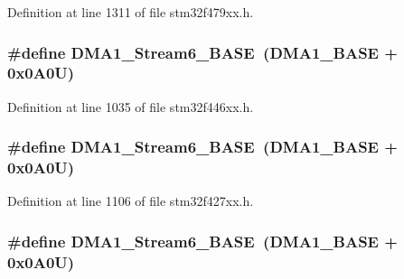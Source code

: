 Definition at line 1311 of file stm32f479xx.\+h.

\subsubsection[{\texorpdfstring{D\+M\+A1\+\_\+\+Stream6\+\_\+\+B\+A\+SE}{DMA1_Stream6_BASE}}]{\setlength{\rightskip}{0pt plus 5cm}\#define D\+M\+A1\+\_\+\+Stream6\+\_\+\+B\+A\+SE~({\bf D\+M\+A1\+\_\+\+B\+A\+SE} + 0x0\+A0\+U)}\hypertarget{group___peripheral__memory__map_ga58998ddc40adb6361704d6c9dad08125}{}\label{group___peripheral__memory__map_ga58998ddc40adb6361704d6c9dad08125}


Definition at line 1035 of file stm32f446xx.\+h.

\subsubsection[{\texorpdfstring{D\+M\+A1\+\_\+\+Stream6\+\_\+\+B\+A\+SE}{DMA1_Stream6_BASE}}]{\setlength{\rightskip}{0pt plus 5cm}\#define D\+M\+A1\+\_\+\+Stream6\+\_\+\+B\+A\+SE~({\bf D\+M\+A1\+\_\+\+B\+A\+SE} + 0x0\+A0\+U)}\hypertarget{group___peripheral__memory__map_ga58998ddc40adb6361704d6c9dad08125}{}\label{group___peripheral__memory__map_ga58998ddc40adb6361704d6c9dad08125}


Definition at line 1106 of file stm32f427xx.\+h.

\subsubsection[{\texorpdfstring{D\+M\+A1\+\_\+\+Stream6\+\_\+\+B\+A\+SE}{DMA1_Stream6_BASE}}]{\setlength{\rightskip}{0pt plus 5cm}\#define D\+M\+A1\+\_\+\+Stream6\+\_\+\+B\+A\+SE~({\bf D\+M\+A1\+\_\+\+B\+A\+SE} + 0x0\+A0\+U)}\hypertarget{group___peripheral__memory__map_ga58998ddc40adb6361704d6c9dad08125}{}\label{group___peripheral__memory__map_ga58998ddc40adb6361704d6c9dad08125}


